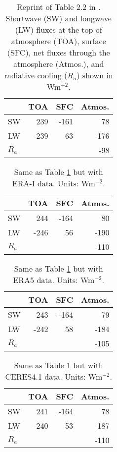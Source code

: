 \documentclass[11pt]{article}
\begin{document}
\begin{table}[htbp]
\caption{\label{tab:orgf86a5a0}Reprint of Table 2.2 in \cite{randall_atmosphere_2012}. Shortwave (SW) and longwave (LW) fluxes at the top of atmosphere (TOA), surface (SFC), net fluxes through the atmosphere (Atmos.), and radiative cooling (\(R_a\)) shown in Wm\(^{-2}\).}
\centering
\begin{tabular}{lrrr}
\hline
 & TOA & SFC & Atmos.\\
\hline
SW & 239 & -161 & 78\\
LW & -239 & 63 & -176\\
\hline
\(R_a\) &  &  & -98\\
\hline
\end{tabular}
\end{table}

\begin{table}[htbp]
\caption{\label{tab:org04774cc}Same as Table \ref{tab:orgf86a5a0} but with ERA-I data. Units: Wm\(^{-2}\).}
\centering
\begin{tabular}{lrrr}
\hline
 & TOA & SFC & Atmos.\\
\hline
SW & 244 & -164 & 80\\
LW & -246 & 56 & -190\\
\hline
\(R_a\) &  &  & -110\\
\hline
\end{tabular}
\end{table}

\begin{table}[htbp]
\caption{\label{tab:org31af5d2}Same as Table \ref{tab:orgf86a5a0} but with ERA5 data. Units: Wm\(^{-2}\).}
\centering
\begin{tabular}{lrrr}
\hline
 & TOA & SFC & Atmos.\\
\hline
SW & 243 & -164 & 79\\
LW & -242 & 58 & -184\\
\hline
\(R_a\) &  &  & -105\\
\hline
\end{tabular}
\end{table}

\begin{table}[htbp]
\caption{\label{tab:orgaaee4f9}Same as Table \ref{tab:orgf86a5a0} but with CERES4.1 data. Units: Wm\(^{-2}\).}
\centering
\begin{tabular}{lrrr}
\hline
 & TOA & SFC & Atmos.\\
\hline
SW & 241 & -164 & 78\\
LW & -240 & 53 & -187\\
\hline
\(R_a\) &  &  & -110\\
\hline
\end{tabular}
\end{table}
\end{document}
